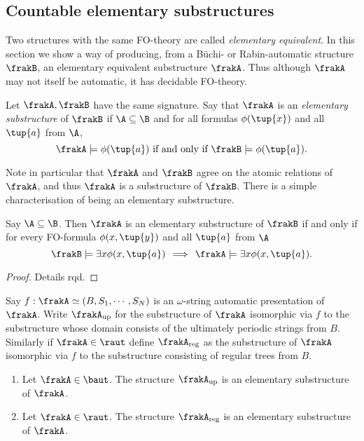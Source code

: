 

\subsection{Countable elementary substructures}

Two structures with the same FO-theory are called {\em elementary equivalent}.
In this section we show a way of producing, from a B\"uchi- or Rabin-automatic structure $\frakB$, an elementary equivalent 
substructure $\frakA$. Thus although $\frakA$ may not itself be automatic, it has decidable FO-theory.

Let $\frakA,\frakB$ have the same signature. 
Say that $\frakA$ is an {\em elementary substructure} of $\frakB$ if 
$\A \subseteq \B$ and for all formulas $\phi(\tup{x})$ and all $\tup{a}$ from $\A$,
\[
\frakA \models \phi(\tup{a}) \mbox{ if and only if } \frakB \models \phi(\tup{a}).
\]

Note in particular that $\frakA$ and $\frakB$ agree on the atomic relations of $\frakA$, and thus $\frakA$ is a substructure of $\frakB$.
There is a simple characterisation of being an elementary substructure.

\begin{lemma}
Say $\A \subseteq \B$.
Then $\frakA$ is an elementary substructure of $\frakB$ if and only if  for every FO-formula $\phi(x,\tup{y})$ and all $\tup{a}$ from $\A$
\[
\frakB \models \exists x \phi(x,\tup{a}) \,  \implies\,  \frakA \models \exists x \phi(x,\tup{a}).
\]
\end{lemma}

\begin{proof}
Details rqd.
\end{proof}

Say $f:\frakA \simeq (B,S_1,\cdots,S_N)$ is an $\omega$-string automatic presentation of $\frakA$. %
Write $\frakA_{\rm{up}}$ for the substructure of $\frakA$ isomorphic via $f$ to the substructure whose domain consists of the ultimately periodic strings from $B$.
Similarly if $\frakA \in \raut$ define $\frakA_{\rm{reg}}$ as the substructure of $\frakA$ isomorphic via $f$ to the substructure consisting of regular trees from $B$.

\begin{proposition}
\begin{enumerate}
\item Let $\frakA \in \baut$. The structure $\frakA_{\rm{up}}$ is an elementary substructure of $\frakA$.
\item Let $\frakA \in \raut$. The structure $\frakA_{\rm{reg}}$ is an elementary substructure of $\frakA$.
\end{enumerate}
\end{proposition}

